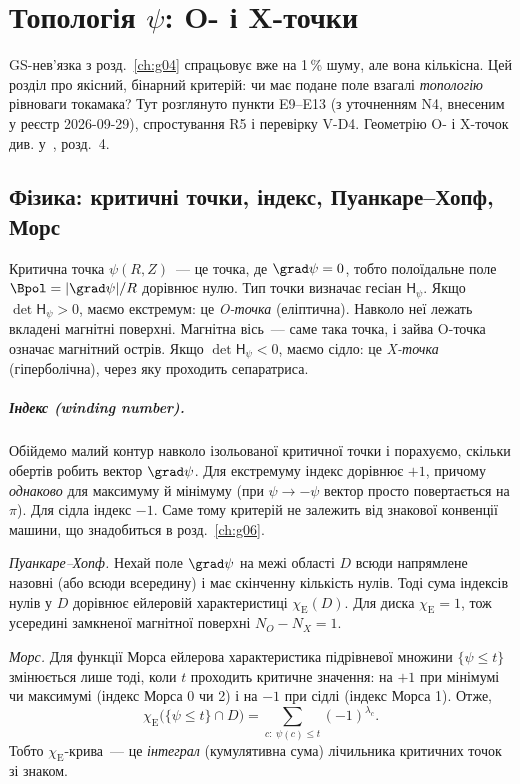 \chapter{Топологія \texorpdfstring{$\psi$}{ψ}: O- і X-точки}\label{ch:g05}

GS-нев'язка з розд.~\ref{ch:g04} спрацьовує вже на 1\,\% шуму, але вона кількісна. Цей розділ про якісний, бінарний критерій: чи має подане поле взагалі \emph{топологію} рівноваги токамака? Тут розглянуто пункти E9--E13 (з уточненням N4, внесеним у реєстр 2026-09-29), спростування R5 і перевірку V-D4. Геометрію O- і X-точок див. у~\cite{Manual}, розд.~4.

\section{Фізика: критичні точки, індекс, Пуанкаре--Хопф, Морс}\label{sec:g05-physics}

Критична точка $\psi(R,Z)$~--- це точка, де $\grad\psi=0$, тобто полоїдальне поле $\Bpol=|\grad\psi|/R$ дорівнює нулю. Тип точки визначає гесіан $\mathsf H_\psi$. Якщо $\det\mathsf H_\psi>0$, маємо екстремум: це \emph{O-точка} (еліптична). Навколо неї лежать вкладені магнітні поверхні. Магнітна вісь~--- саме така точка, і зайва O-точка означає магнітний острів. Якщо $\det\mathsf H_\psi<0$, маємо сідло: це \emph{X-точка} (гіперболічна), через яку проходить сепаратриса.

\paragraph{Індекс (winding number).} Обійдемо малий контур навколо ізольованої критичної точки і порахуємо, скільки обертів робить вектор $\grad\psi$. Для екстремуму індекс дорівнює $+1$, причому \emph{однаково} для максимуму й мінімуму (при $\psi\to-\psi$ вектор просто повертається на $\pi$). Для сідла індекс $-1$. Саме тому критерій не залежить від знакової конвенції машини, що знадобиться в розд.~\ref{ch:g06}.

\begin{outofcorpus}
\emph{Пуанкаре--Хопф.} Нехай поле $\grad\psi$ на межі області $D$ всюди напрямлене назовні (або всюди всередину) і має скінченну кількість нулів. Тоді сума індексів нулів у $D$ дорівнює ейлеровій характеристиці $\chi_{\mathrm E}(D)$. Для диска $\chi_{\mathrm E}=1$, тож усередині замкненої магнітної поверхні $N_O-N_X=1$.

\emph{Морс.} Для функції Морса ейлерова характеристика підрівневої множини $\{\psi\le t\}$ змінюється лише тоді, коли $t$ проходить критичне значення: на $+1$ при мінімумі чи максимумі (індекс Морса 0 чи 2) і на $-1$ при сідлі (індекс Морса 1). Отже,
\begin{equation}\label{eq:g05-morse}
  \chi_{\mathrm E}\big(\{\psi\le t\}\cap D\big)=\sum_{c:\ \psi(c)\le t}(-1)^{\lambda_c}.
\end{equation}
Тобто $\chi_{\mathrm E}$-крива~--- це \emph{інтеграл} (кумулятивна сума) лічильника критичних точок зі знаком.
\end{outofcorpus}

